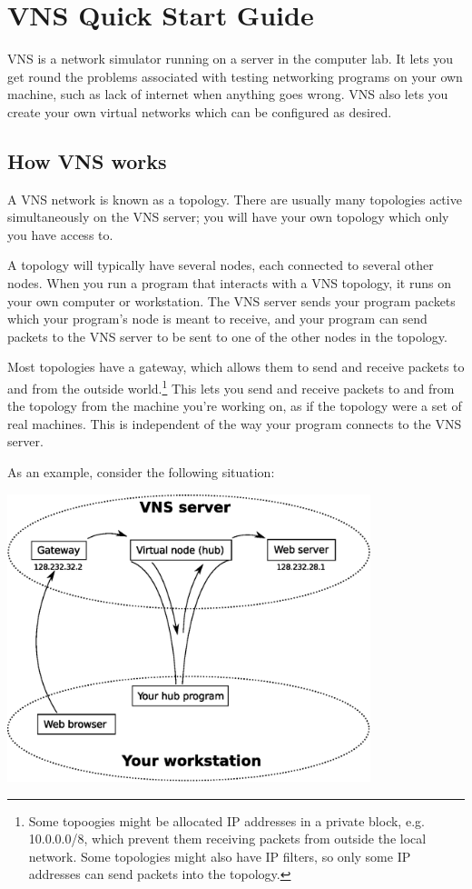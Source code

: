 \documentclass[a4paper,12pt]{article}
\begin{document}
\section*{VNS Quick Start Guide}

VNS is a network simulator running on a server in the computer lab.  It lets you get round the problems associated with testing networking programs on your own machine, such as lack of internet when anything goes wrong.  VNS also lets you create your own virtual networks which can be configured as desired.

\subsection*{How VNS works}
A VNS network is known as a topology.  There are usually many topologies active simultaneously on the VNS server; you will have your own topology which only you have access to.

A topology will typically have several nodes, each connected to several other nodes.  When you run a program that interacts with a VNS topology, it runs on your own computer or workstation.  The VNS server sends your program packets which your program's node is meant to receive, and your program can send packets to the VNS server to be sent to one of the other nodes in the topology.

Most topologies have a gateway, which allows them to send and receive packets to and from the outside world.\footnote{Some topoogies might be allocated IP addresses in a private block, e.g. 10.0.0.0/8, which prevent them receiving packets from outside the local network.  Some topologies might also have IP filters, so only some IP addresses can send packets into the topology.}  This lets you send and receive packets to and from the topology from the machine you're working on, as if the topology were a set of real machines.  This is independent of the way your program connects to the VNS server.

As an example, consider the following situation:

\mbox{\includegraphics[width=300pt]{example.eps}}
\end{document}
